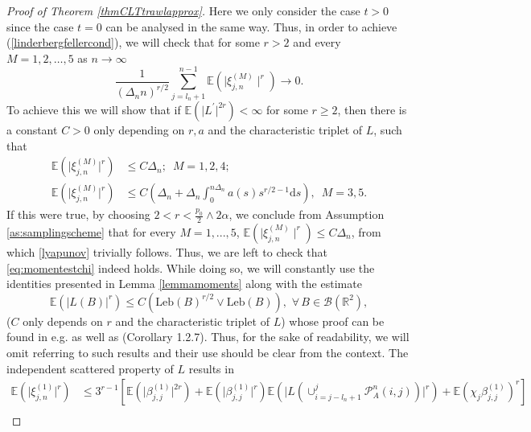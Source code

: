 \documentclass{article}
\theoremstyle{plain}
\theoremstyle{definition}
\theoremstyle{remark}
\begin{document}
\begin{appendix}
\begin{proof}[Proof of Theorem  \ref{thmCLTtrawlapprox}]
	Here we only consider the case $t>0$ since the case $t=0$ can be
	analysed in the same way. Thus, in order to achieve (\ref{linderbergfellercond}),
	we will check that for some $r>2$ and every $M=1,2,\ldots,5$ as
	$n\rightarrow\infty$
	\begin{equation}
		\frac{1}{(\Delta_{n}n)^{r/2}}\sum_{j=l_{n}+1}^{n-1}\mathbb{E}(\mid\xi_{j,n}^{(M)}\mid^{r})\rightarrow0.\label{lyapunov}
	\end{equation}
To achieve this we will show that if  $\mathbb{E}(\rvert L^{\prime}\rvert^{2r})<\infty$ for some $r\geq2$, then there
is a constant $C>0$ only depending on  $r,a$ and the characteristic triplet of $L$, such that 
\begin{equation}\label{eq:momentestchi}
\begin{aligned}
      \mathbb{E}(\rvert\xi_{j,n}^{(M)}\rvert^{r})&\leq C\Delta_{n};\,\,\,M=1,2,4;   \\
   \mathbb{E}(\rvert\xi_{j,n}^{(M)}\rvert^{r})&\leq C(\Delta_{n}+\Delta_{n}\int_{0}^{n\Delta_{n}}a(s)s^{r/2-1}\mathrm{d}s),\,\,\,M=3,5.
\end{aligned}
\end{equation} If this were true,  by choosing $2<r<\frac{p_{0}}{2}\land2\alpha$, we conclude from Assumption \ref{as:samplingscheme} that for every $M=1,...,5$, $\mathbb{E}(\mid\xi_{j,n}^{(M)}\mid^{r})\leq C\Delta_n$, from which  \eqref{lyapunov} trivially follows. Thus, we are left to check that \eqref{eq:momentestchi} indeed holds. While doing so, we will constantly use the identities
	presented in Lemma \ref{lemmamoments} along with the estimate
 \begin{equation}
\mathbb{E}(\rvert L(B)\rvert^{r})\leq C(\mathrm{Leb}(B)^{r/2}\lor\mathrm{Leb}(B)),\,\,\forall\,\ensuremath{B\in\mathcal{B}(\mathbb{R}^{2}),}\label{momentineq}
\end{equation}  
($C$ only depends on   $r$ and the characteristic triplet of $L$) whose proof can be found in e.g. \cite{LuschPages08}  as well as \cite{Turner11} (Corollary 1.2.7). Thus, for the sake of readability, we will omit referring to such results and their use should be clear from the context.  The independent scattered property of $L$ results in
	\begin{align*}
		\mathbb{E}(\rvert\xi_{j,n}^{(1)}\rvert^{r}) & \leq 3^{r-1}[\mathbb{E}(\rvert\beta_{j,j}^{(1)}\rvert^{2r})+\mathbb{E}(\rvert\beta_{j,j}^{(1)}\rvert^{r})\mathbb{E}(\rvert L(\cup_{i=j-l_n+1}^{j}\mathcal{P}_{A}^{n}(i,j))\rvert^{r})+\mathbb{E}(\chi_{j}\beta_{j,j}^{(1)})^{r} ]\\

\end{align*}
\end{proof}
\end{appendix}
\end{document}
